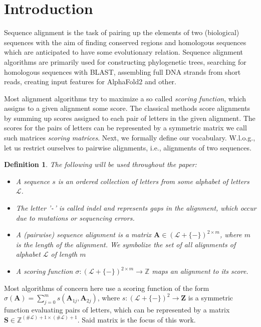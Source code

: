\documentclass{article}
\newtheorem{definition}{Definition}
\begin{document}
\section{Introduction}
Sequence alignment is the task of pairing up the elements of two (biological) sequences
with the aim of finding conserved regions and homologous sequences which are anticipated to have some
evolutionary relation. Sequence alignment algorithms are primarily used for constructing phylogenetic
trees, searching for homologous sequences with BLAST, assembling full DNA strands from short reads,
creating input features for AlphaFold2 and other.

Most alignment algorithms try to maximize a so called \emph{scoring function}, which assigns to a given alignment some score.
The classical methods score alignments by summing up scores assigned to each pair of letters in the given alignment.
The scores for the pairs of letters can be represented by a symmetric matrix \- we call such matrices \emph{scoring matrices}.
Next, we formally define our vocabulary. W.l.o.g., let us restrict ourselves to pairwise alignments, i.e., alignments of two sequences.

\begin{definition}
    The following will be used throughout the paper:
    \begin{itemize}
        \item A \emph{sequence} $s$ is an ordered collection of letters from some alphabet of letters $\mathcal{L}$.
        \item The letter '\texttt{-}' is called \emph{indel} and represents gaps in the alignment, which occur due to mutations or sequencing errors.
        \item A (pairwise) \emph{sequence alignment} is a matrix
              $\mathbf A \in (\mathcal{L} + \{\mathtt{-}\})^{2 \times m}$, where $m$ is the length of the alignment.
              We symbolize the set of all alignments of alphabet $\mathcal L$ of length $m$
        \item A scoring function $\sigma: (\mathcal{L} + \{\mathtt{-}\})^{2 \times m} \to \mathbb{Z}$ maps an alignment to its score.
    \end{itemize}
\end{definition}
Most algorithms of concern here use a scoring function of the form $\sigma(\mathbf A) = \sum_{j=0}^m s(\mathbf A_{1j}, \mathbf A_{2j})$, where $s: (\mathcal L + \{\mathtt{-}\})^2 \to \mathbf{Z}$ is a symmetric function
evaluating pairs of letters, which can be represented by a matrix $\mathbf S \in \mathbb Z^{(\# \mathcal L) + 1 \times (\# \mathcal L) + 1}$. Said matrix is the focus of this work.
\end{document}
